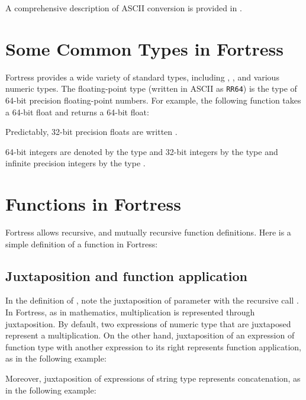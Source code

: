 A comprehensive description of ASCII conversion is provided in
.

\section{Some Common Types in Fortress}

Fortress provides a wide variety of standard types, including
, , and various numeric types.
The floating-point type  (written in ASCII as \verb$RR64$)
is the type of 64-bit precision floating-point numbers.
For example, the following function takes a 64-bit
 float and returns a 64-bit float:


Predictably, 32-bit precision floats are written .

64-bit integers are denoted by the type  and
32-bit integers by the type 
and infinite precision integers by the type .

\section{Functions in Fortress}
Fortress allows recursive, and mutually recursive function definitions.
Here is a simple definition of a  function in Fortress:



\subsection{Juxtaposition and function application}

In the definition of ,
note the juxtaposition of parameter  with the recursive
call .
In Fortress, as in mathematics,
multiplication is represented through juxtaposition.
By default,
two expressions of numeric type that are juxtaposed
represent a multiplication.
On the other hand,
juxtaposition of an expression of function type
with another expression to its right
represents function application,
as in the following example:



Moreover, juxtaposition of expressions of string type
represents concatenation, as in the following example:

